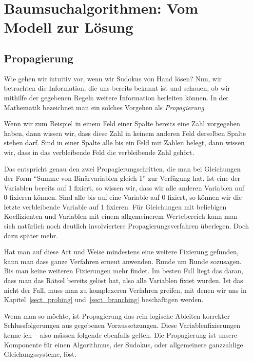 \chapter{Baumsuchalgorithmen: Vom Modell zur Lösung}
\label{chap_technik}

\section{Propagierung}
\label{sect_propagierung}
Wie gehen wir intuitiv vor, wenn wir Sudokus von Hand lösen? Nun, wir
betrachten die Information, die uns bereits bekannt ist und schauen,
ob wir mithilfe der gegebenen Regeln weitere Information herleiten
können. In der Mathematik bezeichnet man ein solches Vorgehen als
\emph{Propagierung}.

Wenn wir zum Beispiel in einem Feld einer Spalte bereits eine Zahl vorgegeben
haben, dann wissen wir, dass diese Zahl in keinem anderen Feld
derselben Spalte stehen darf. Sind in einer Spalte alle bis ein Feld
mit Zahlen belegt, dann wissen wir, dass in das verbleibende Feld die
verbleibende Zahl gehört.

Das entspricht genau den zwei Propagierungschritten, die man bei
Gleichungen der Form ``Summe von Binärvariablen gleich 1'' zur Verfügung hat.
Ist eine der Variablen bereits auf 1 fixiert, so wissen wir, dass wir alle anderen Variablen auf 0 fixieren können. Sind alle bis auf eine Variable auf 0 fixiert, so können wir die letzte verbleibende Variable auf 1 fixieren.
Für Gleichungen mit beliebigen Koeffizienten und Variablen mit einem allgemeinerem Wertebereich kann man sich natürlich noch deutlich involviertere Propagierungsverfahren überlegen. Doch dazu später mehr. 

Hat man auf diese Art und Weise mindestens eine weitere Fixierung gefunden, kann man dass ganze Verfahren erneut anwenden. Runde um Runde sozusagen. Bis man keine weiteren Fixierungen mehr findet. Im besten Fall liegt das daran, dass man das Rätsel bereits gelöst hat, also alle Variablen fixiet wurden. Ist das nicht der Fall, muss man zu komplexeren Verfahren greifen, mit denen wir uns in Kapitel~\ref{sect_probing} und~\ref{sect_branching} beschäftigen werden.
 
Wenn man so möchte, ist Propagierung das rein logische Ableiten korrekter Schlussfolgerungen aus gegebenen Voraussetzungen. Diese Variablenfixierungen kenne ich -- also müssen folgende ebenfalls gelten. Die Propagierung ist unsere Komponente für einen Algorithmus, der Sudokus, oder allgemeinere ganzzahlige Gleichungssysteme, löst.

